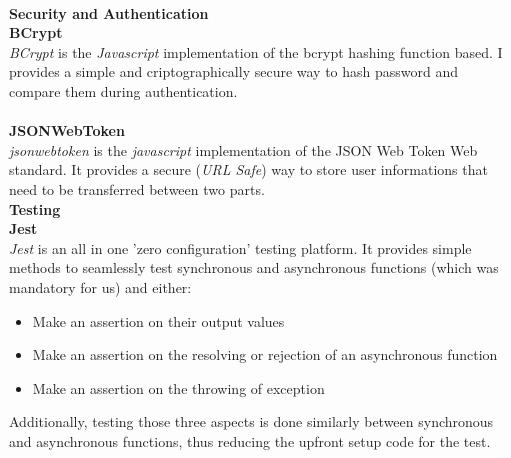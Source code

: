 \vspace{0.5em}
\\
\textbf{Security and Authentication}
\\
\textbf{BCrypt}\\
\textit{BCrypt} is the \textit{Javascript} implementation of the bcrypt hashing function based.
I provides a simple and criptographically secure way to hash password and compare them during authentication.\\
\vspace{0.5em}
\\
\textbf{JSONWebToken} \\
\textit{jsonwebtoken} is the \textit{javascript} implementation of the JSON Web Token Web standard. It provides a secure (\textit{URL Safe}) way to store user informations that need to be transferred between two parts. 
\vspace{0.5em}
\\
\textbf{Testing}\\
\textbf{Jest}\\
\textit{Jest} is an all in one 'zero configuration' testing platform. It provides simple methods to seamlessly test synchronous and asynchronous functions (which was mandatory for us) and either: 
\begin{itemize}
    \item Make an assertion on their output values
    \item Make an assertion on the resolving or rejection of an asynchronous function
    \item Make an assertion on the throwing of exception
\end{itemize}
Additionally, testing those three aspects is done similarly between synchronous and asynchronous functions, thus reducing the upfront setup code for the test.